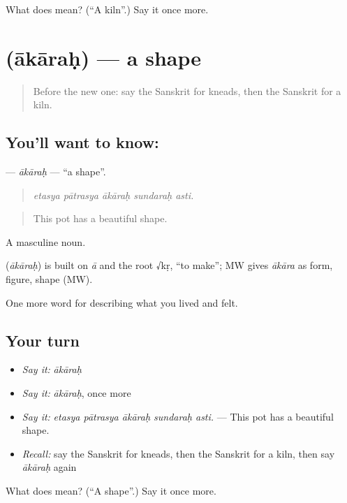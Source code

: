 \begin{tcolorbox}[breakable,colback=teal!4,colframe=teal!35!black,title={Before you move on}]
What does  mean? (\textquotedblleft{}A kiln\textquotedblright{}.) Say it once more.
\end{tcolorbox}
\section[\texorpdfstring{\sk{आकारः} (ākāraḥ)}{आकारः (ākāraḥ)}]{ (ākāraḥ) — a shape}

\label{lesson:SA-C505-akarah}



\begin{quote}
Before the new one: say the Sanskrit for kneads, then the Sanskrit for a kiln.
\end{quote}

\subsection*{You'll want to know: }
\textbf{} — \emph{ākāraḥ} — \textquotedblleft{}a shape\textquotedblright{}.

\begin{quote}
    
\end{quote}

\begin{quote}
\emph{etasya pātrasya ākāraḥ sundaraḥ asti.}
\end{quote}

\begin{quote}
This pot has a beautiful shape.
\end{quote}

A masculine noun.

\begin{cousinweb}
\textbf{} (\emph{ākāraḥ}) is built on \emph{ā} and the root √kṛ, \textquotedblleft{}to make\textquotedblright{}; MW gives \emph{ākāra} as form, figure, shape (MW).
\end{cousinweb}

\begin{grammarlens}[title={What you've built}]
One more word for describing what you lived and felt.
\end{grammarlens}

\subsection*{Your turn}
\begin{itemize}
\raggedright
  \item \emph{Say it:} \emph{ākāraḥ}
  \item \emph{Say it:} \emph{ākāraḥ}, once more
  \item \emph{Say it:} \emph{etasya pātrasya ākāraḥ sundaraḥ asti.} — This pot has a beautiful shape.
  \item \emph{Recall:} say the Sanskrit for kneads, then the Sanskrit for a kiln, then say \emph{ākāraḥ} again
\end{itemize}

\begin{tcolorbox}[breakable,colback=teal!4,colframe=teal!35!black,title={Before you move on}]
What does  mean? (\textquotedblleft{}A shape\textquotedblright{}.) Say it once more.
\end{tcolorbox}

